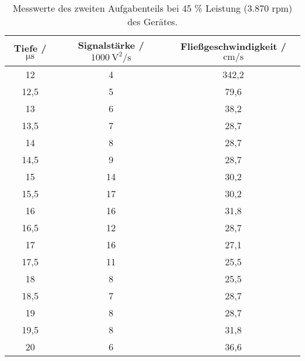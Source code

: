 \begin{table}[H]
  \centering
  \caption{Messwerte des zweiten Aufgabenteils bei 45 \% Leistung (3.870 rpm) des Gerätes.}
  \label{tab:Werte2}
  \begin{tabular}{c c c}
    \toprule
    Tiefe / $\si{\micro\second}$ & Signalstärke / $\SI{1000}{\square\volt\per\second}$ & Fließgeschwindigkeit / $\si{\centi\meter\per\second}$ \\
    \midrule
    12 & 4 & 342,2 \\
    12,5 & 5 & 79,6 \\
    13 & 6 & 38,2 \\
    13,5 & 7 & 28,7 \\
    14 & 8 & 28,7 \\
    14,5 & 9 & 28,7 \\
    15 & 14 & 30,2 \\
    15,5 & 17 & 30,2 \\
    16 & 16 & 31,8 \\
    16,5 & 12 & 28,7 \\
    17 & 16 & 27,1 \\
    17,5 & 11 & 25,5 \\
    18 & 8 & 25,5 \\
    18,5 & 7 & 28,7 \\
    19 & 8 & 28,7 \\
    19,5 & 8 & 31,8 \\
    20 & 6 & 36,6 \\
    \bottomrule
  \end{tabular}
\end{table}